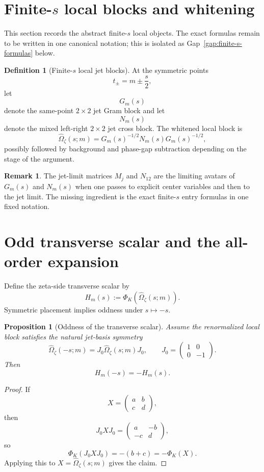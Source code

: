 \documentclass[11pt]{article}
\theoremstyle{plain}
\newtheorem{proposition}[theorem]{Proposition}
\theoremstyle{definition}
\newtheorem{definition}[theorem]{Definition}
\newtheorem{remark}[theorem]{Remark}
\begin{document}
\section{Finite-$s$ local blocks and whitening}

This section records the abstract finite-$s$ local objects. The exact formulas remain to be written in one canonical notation; this is isolated as Gap~\ref{gap:finite-s-formulas} below.

\begin{definition}[Finite-$s$ local jet blocks]
At the symmetric points
\[
t_\pm=m\pm \frac{s}{2},
\]
let
\[
G_m(s)
\]
denote the same-point $2\times 2$ jet Gram block and let
\[
N_m(s)
\]
denote the mixed left-right $2\times 2$ jet cross block. The whitened local block is
\[
\widehat\Omega_\zeta(s;m)=G_m(s)^{-1/2}N_m(s)G_m(s)^{-1/2},
\]
possibly followed by background and phase-gap subtraction depending on the stage of the argument.
\end{definition}

\begin{remark}
The jet-limit matrices $M_j$ and $N_{12}$ are the limiting avatars of $G_m(s)$ and $N_m(s)$ when one passes to explicit center variables and then to the jet limit. The missing ingredient is the exact finite-$s$ entry formulas in one fixed notation.
\end{remark}

\section{Odd transverse scalar and the all-order expansion}

Define the zeta-side transverse scalar by
\[
H_m(s):=\Phi_K(\widehat\Omega_\zeta(s;m)).
\]
Symmetric placement implies oddness under $s\mapsto -s$.

\begin{proposition}[Oddness of the transverse scalar]
Assume the renormalized local block satisfies the natural jet-basis symmetry
\[
\widehat\Omega_\zeta(-s;m)=J_0\widehat\Omega_\zeta(s;m)J_0,
\qquad
J_0=
\begin{pmatrix}
1&0\\0&-1
\end{pmatrix}.
\]
Then
\[
H_m(-s)=-H_m(s).
\]
\end{proposition}

\begin{proof}
If
\[
X=
\begin{pmatrix}
a&b\\c&d
\end{pmatrix},
\]
then
\[
J_0XJ_0=
\begin{pmatrix}
a&-b\\-c&d
\end{pmatrix},
\]
so
\[
\Phi_K(J_0XJ_0)=-(b+c)=-\Phi_K(X).
\]
Applying this to $X=\widehat\Omega_\zeta(s;m)$ gives the claim.
\end{proof}
\end{document}
